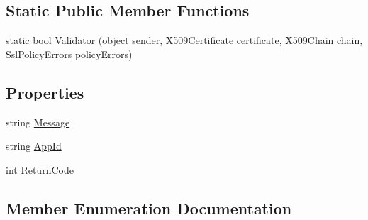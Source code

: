 \subsection*{Static Public Member Functions}
\begin{DoxyCompactItemize}
\item 
static bool \hyperlink{class_account_service_adb8216071aff4ae5088e65879f824376}{Validator} (object sender, X509\+Certificate certificate, X509\+Chain chain, Ssl\+Policy\+Errors policy\+Errors)
\end{DoxyCompactItemize}
\subsection*{Properties}
\begin{DoxyCompactItemize}
\item 
string \hyperlink{class_account_service_af80209c3fba8bbd0d70a19fac0efda34}{Message}
\item 
string \hyperlink{class_account_service_aac56e602baed20f1f03bd6647da7ce0e}{App\+Id}
\item 
int \hyperlink{class_account_service_a203023d7caa8f3f41cc71bf538903ceb}{Return\+Code}
\end{DoxyCompactItemize}


\subsection{Member Enumeration Documentation}
